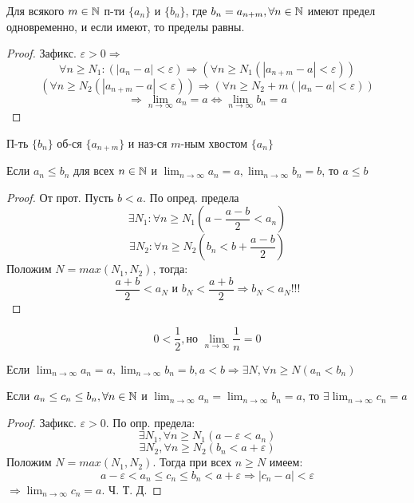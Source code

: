 \begin{lemma}
    Для всякого $m \in \mathbb{N}$ п-ти $\{a_n\}$ и $\{b_n\}$, где $b_n = a_{n + m}, \forall n \in \mathbb{N}$ имеют предел одновременно, и если имеют, то пределы равны.
\end{lemma}
\begin{proof}
    Зафикс. $\varepsilon > 0 \Rightarrow$
    \[
    \forall n \geq N_1 \colon  (|a_n - a| < \varepsilon) \Rightarrow (\forall n \geq N_1(|a_{n + m} - a| < \varepsilon))
    \] 
    \[
        (\forall n \geq N_2 (|a_{n + m} - a| < \varepsilon)) \Rightarrow (\forall n \geq N_2 + m (|a_n - a| < \varepsilon))
    \] 
    \[
    \Rightarrow \lim_{n\to\infty} a_n = a \iff \lim_{n\to\infty}b_n = a
    \] 
\end{proof}
\begin{definition}
П-ть $\{b_n\}$ об-ся $\{a_{n + m}\}$ и наз-ся $m$-ным хвостом $\{a_n\}$
\end{definition}
\begin{theorem}
Если $a_n \leq b_n$ для всех $n \in \mathbb{N}$ и $\lim_{n\to\infty}a_n = a, \lim_{n\to\infty}b_n = b$, то $a \leq b$
\end{theorem}
\begin{proof}
От прот. Пусть $b < a$. По опред. предела
\[
    \exists N_1 \colon \forall n \geq N_1 (a - \frac{a - b}{2} < a_n)
\]
\[
\exists N_2 \colon  \forall n \geq N_2 (b_n < b + \frac{a - b}{2})
\] 
Положим $N = max(N_1, N_2)$, тогда:
\[
\frac{a + b}{2} < a_N \text{ и } b_N < \frac{a + b}{2} \Rightarrow b_N < a_N !!!
\] 
\end{proof}
\begin{note}
\begin{example}
\[
0 < \frac{1}{2}, \text{но } \lim_{n\to\infty} \frac{1}{n} = 0
\] 
\end{example}
\end{note}
\begin{consequence}
Если $\lim_{n\to\infty}a_n = a, \lim_{n\to\infty}b_n = b, a < b \Rightarrow \exists N, \forall n \geq N (a_n < b_n)$
\end{consequence}
\begin{theorem}[О зажатой п-ти]
Если $a_n \leq c_n \leq b_n, \forall n \in \mathbb{N}$ и $\lim_{n\to\infty}a_n = \lim_{n\to\infty}b_n = a$, то $\exists \lim_{n\to\infty}c_n = a$
\end{theorem}
\begin{proof}
Зафикс. $\varepsilon > 0$. По опр. предела:
\[
    \exists N_1, \forall n \geq N_1 (a - \varepsilon < a_n)
\]
\[
    \exists N_2, \forall n \geq N_2(b_n < a + \varepsilon)
\] 
Положим $N = max(N_1, N_2)$. Тогда при всех $n \geq N$ имеем:
\[
a - \varepsilon < a_n \leq c_n \leq b_n < a + \varepsilon \Rightarrow |c_n - a| < \varepsilon
\] 
$\Rightarrow \lim_{n\to\infty} c_n = a$. 
Ч. Т. Д.
\end{proof}
